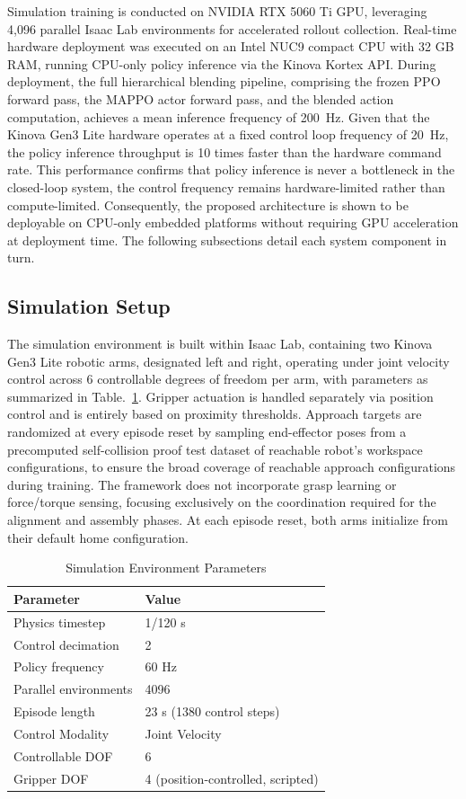 \documentclass[a4paper,fleqn]{cas-dc}
\begin{document}
Simulation training is conducted on NVIDIA RTX 5060 Ti GPU, leveraging 4,096 parallel Isaac Lab environments for accelerated rollout collection. Real-time hardware deployment was executed on an Intel NUC9 compact CPU with 32 GB RAM, running CPU-only policy inference via the Kinova Kortex API. During deployment, the full hierarchical blending pipeline, comprising the frozen PPO forward pass, the MAPPO actor forward pass, and the blended action computation, achieves a mean inference frequency of 200~Hz. Given that the Kinova Gen3 Lite hardware operates at a fixed control loop frequency of 20~Hz, the policy inference throughput is 10 times faster than the hardware command rate. This performance confirms that policy inference is never a bottleneck in the closed-loop system, the control frequency remains hardware-limited rather than compute-limited. Consequently, the proposed architecture is shown to be deployable on CPU-only embedded platforms without requiring GPU acceleration at deployment time. The following subsections detail each system component in turn.

\subsection{Simulation Setup}
\label{simulation_setup}
The simulation environment is built within Isaac Lab, containing two Kinova Gen3 Lite robotic arms, designated left and right, operating under joint velocity control across 6 controllable degrees of freedom per arm, with parameters as summarized in Table.~\ref{tab:hyperparams}. Gripper actuation is handled separately via position control and is entirely based on proximity thresholds. Approach targets are randomized at every episode reset by sampling end-effector poses from a precomputed self-collision proof test dataset of reachable robot's workspace configurations, to ensure the broad coverage of reachable approach configurations during training. The framework does not incorporate grasp learning or force/torque sensing, focusing exclusively on the coordination required for the alignment and assembly phases. At each episode reset, both arms initialize from their default home configuration.

\begin{table}[h]
\centering
\caption{Simulation Environment Parameters}
\begin{tabular}{ll}
\midrule 
\textbf{Parameter} & \textbf{Value} \\
\midrule \midrule
Physics timestep & 1/120 s \\
Control decimation & 2 \\
Policy frequency & 60 Hz \\
Parallel environments & 4096 \\
Episode length & 23 s (1380 control steps) \\
Control Modality & Joint Velocity \\
Controllable DOF & 6 \\
Gripper DOF & 4 (position-controlled, scripted) \\
\bottomrule
\end{tabular}
\label{tab:hyperparams}
\end{table}
\end{document}
